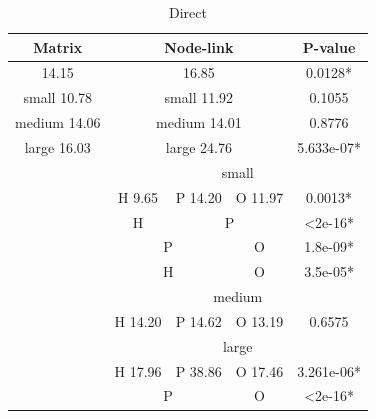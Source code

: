 \documentclass{l4proj}
\begin{document}
\begin{table}[H]
\centering
\caption{Direct}
\label{directResults}
\begin{tabular}{|c|c|c|c|c|c|c|}
\hline
\multicolumn{3}{|c|}{\textbf{Matrix}}     & \multicolumn{3}{c|}{\textbf{Node-link}} & \textbf{P-value}              \\ \hline
\multicolumn{3}{|c|}{14.15}               & \multicolumn{3}{c|}{16.85}              & 0.0128*                       \\ \hline
\multicolumn{3}{|c|}{small 10.78}         & \multicolumn{3}{c|}{small 11.92}        & 0.1055                        \\ \hline
\multicolumn{3}{|c|}{medium 14.06}        & \multicolumn{3}{c|}{medium 14.01}       & 0.8776                        \\ \hline
\multicolumn{3}{|c|}{large 16.03}         & \multicolumn{3}{c|}{large 24.76}        & 5.633e-07*                    \\ \hline
\multicolumn{3}{|c|}{\multirow{12}{*}{}}  & \multicolumn{4}{c|}{small}                                              \\ \cline{4-7} 
\multicolumn{3}{|c|}{}                    & H 9.65      & P 14.20     & O 11.97     & 0.0013*                       \\ \cline{4-7} 
\multicolumn{3}{|c|}{}                    & H           & \multicolumn{2}{c|}{P}    & \textless2e-16*               \\ \cline{4-7} 
\multicolumn{3}{|c|}{}                    & \multicolumn{2}{c|}{P}    & O           & 1.8e-09*                      \\ \cline{4-7} 
\multicolumn{3}{|c|}{}                    & \multicolumn{2}{c|}{H}    & O           & 3.5e-05*                      \\ \cline{4-7} 
\multicolumn{3}{|c|}{}                    & \multicolumn{4}{c|}{medium}                                             \\ \cline{4-7} 
\multicolumn{3}{|c|}{}                    & H 14.20     & P 14.62     & O 13.19     & 0.6575                        \\ \cline{4-7} 
\multicolumn{3}{|c|}{}                    & \multicolumn{4}{c|}{large}                                              \\ \cline{4-7} 
\multicolumn{3}{|c|}{}                    & H 17.96     & P 38.86     & O 17.46     & 3.261e-06*                    \\ \cline{4-7} 
\multicolumn{3}{|c|}{}                    & \multicolumn{2}{c|}{P}    & O           & \textless2e-16*               \\ \cline{4-7} 

\end{tabular}
\end{table}
\end{document}
